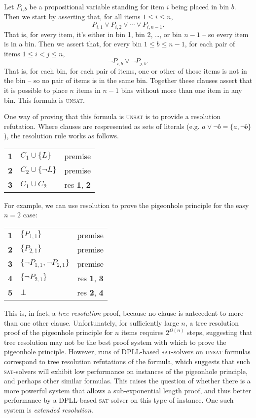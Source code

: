 \documentclass[pdftex,11pt,a4]{article}
\newcommand{\sat}{\textsc{sat}}
\newcommand{\unsat}{\textsc{unsat}}
\begin{document}
Let $P_{i,b}$ be a propositional variable standing for item $i$ being placed in bin $b$. Then we start by asserting that, for all items $1 \leq i \leq n$,
\[P_{i,1} \vee P_{i,2} \vee \cdots \vee P_{i,n-1}.\]
That is, for every item, it's either in bin 1, bin 2, \dots, or bin $n-1$ -- so every item is in a bin. Then we assert that, for every bin $1 \leq b \leq n-1$, for each pair of items $1 \leq i < j \leq n$,
\[\neg P_{i,b} \vee \neg P_{j,b}.\]
That is, for each bin, for each pair of items, one or other of those items is not in the bin -- so no pair of items is in the same bin. Together these clauses assert that it is possible to place $n$ items in $n-1$ bins without more than one item in any bin. This formula is \unsat.

One way of proving that this formula is \unsat{} is to provide a resolution refutation. Where clauses are respresented as sets of literals (e.g. $a \vee \neg b = \{a, \neg b\}$), the resolution rule works as follows.

\begin{table}[h]
  \begin{tabular}{lll}
    {\bf 1} & $C_1 \cup \{L\}$ & premise \\
    {\bf 2} & $C_2 \cup \{\neg L\}$ & premise \\
    {\bf 3} & $C_1 \cup C_2$ & res {\bf 1}, {\bf 2}
  \end{tabular}
\end{table}
\FloatBarrier

For example, we can use resolution to prove the pigeonhole principle for the easy $n = 2$ case:

\begin{table}[h]
  \begin{tabular}{lll}
    {\bf 1} & $\{P_{1,1}\}$ & premise \\
    {\bf 2} & $\{P_{2,1}\}$ & premise \\
    {\bf 3} & $\{\neg P_{1,1}, \neg P_{2,1}\}$ & premise \\
    {\bf 4} & $\{\neg P_{2,1}\}$ & res {\bf 1}, {\bf 3} \\
    {\bf 5} & $\bot$ & res {\bf 2}, {\bf 4}
  \end{tabular}
\end{table}
\FloatBarrier

This is, in fact, a \emph{tree resolution} proof, because no clause is antecedent to more than one other clause. Unfortunately, for sufficiently large $n$, a tree resolution proof of the pigeonhole principle for $n$ items requires $2^{\Omega(n)}$ steps, suggesting that tree resolution may not be the best proof system with which to prove the pigeonhole principle.
However, runs of DPLL-based \sat{}-solvers on \unsat{} formulas correspond to tree resolution refutations of the formula, which suggests that such \sat{}-solvers will exhibit low performance on instances of the pigeonhole principle, and perhaps other similar formulas.
This raises the question of whether there is a more powerful system that allows a sub-exponential length proof, and thus better performance by a DPLL-based \sat{}-solver on this type of instance. One such system is \emph{extended resolution}.
\end{document}
